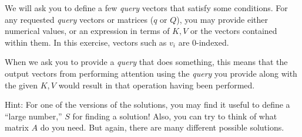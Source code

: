 \documentclass{article}
\begin{document}
We will ask you to define a few \textit{query} vectors that satisfy some
conditions. For any requested \textit{query} vectors or matrices ($q$ or $Q$),
you may provide either numerical values, or an expression in terms of $K, V$ or
the vectors contained within them. In this exercise, vectors such as $v_i$ are
0-indexed. 

When we ask you to provide a \textit{query} that does something, this means that
the output vectors from performing attention using the \textit{query} you
provide along with the given $K,V$ would result in that operation having been
performed. 

Hint: For one of the versions of the solutions, you may find it useful to define
a ``large number,'' $S$ for finding a solution! Also, you can try to think of
what matrix $A$ do you need. But again, there are many different possible
solutions.
\end{document}
